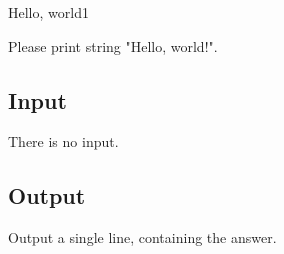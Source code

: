 \begin{Problem}{Hello, world}{1}

Please print string "Hello, world!".

\subsection*{Input}

There is no input.

\subsection*{Output}

Output a single line, containing the answer.


\end{Problem}
